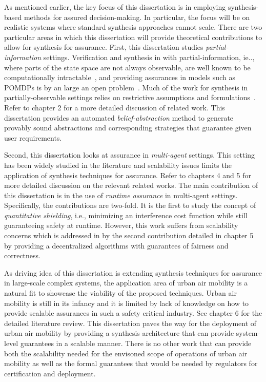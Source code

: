 As mentioned earlier, the key focus of this dissertation is in employing synthesis-based methods for assured decision-making. In particular, the focus will be on realistic systems where standard synthesis approaches cannot scale. There are two particular areas in which this dissertation will provide theoretical contributions to allow for synthesis for assurance. First, this dissertation studies \emph{partial-information} settings. Verification and synthesis in with partial-information, ie.., where parts of the state space are not always observable, are well known to be computationally intractable~\cite{Baier2009ModelCL}, and providing assurances in models such as POMDPs is by an large an open problem~\cite{partialinfoltl}. Much of the work for synthesis in partially-observable settings relies on restrictive assumptions and formulations~\cite{6426524,6426174}. Refer to chapter 2 for a more detailed discussion of related work. This dissertation provides an automated \emph{belief-abstraction} method to generate provably sound abstractions and corresponding strategies that guarantee given user requirements. 

Second, this dissertation looks at assurance in \emph{multi-agent} settings. This setting has been widely studied in the literature and scalability issues limits the application of synthesis techniques for assurance. Refer to chapters 4 and 5 for more detailed discussion on the relevant related works. The main contribution of this dissertation is in the use of \emph{runtime assurance} in multi-agent settings. Specifically, the contributions are two-fold. It is the first to study the concept of \emph{quantitative shielding}, i.e., minimizing an interference cost function while still guaranteeing safety at runtime. However, this work suffers from scalability concerns which is addressed in by the second contribution detailed in chapter 5 by providing a decentralized algorithms with guarantees of fairness and correctness. 

As driving idea of this dissertation is extending synthesis techniques for assurance in large-scale complex systems, the application area of urban air mobility is a natural fit to showcase the viability of the proposed techniques. Urban air mobility is still in its infancy and it is limited by lack of knowledge on how to provide scalable assurances in such a safety critical industry. See chapter 6 for the detailed literature review. This dissertation paves the way for the deployment of urban air mobility by providing a synthesis architecture that can provide system-level guarantees in a scalable manner. There is no other work that can provide both the scalability needed for the envisoned scope of operations of urban air mobility as well as the formal guarantees that would be needed by regulators for certification and deployment. 



